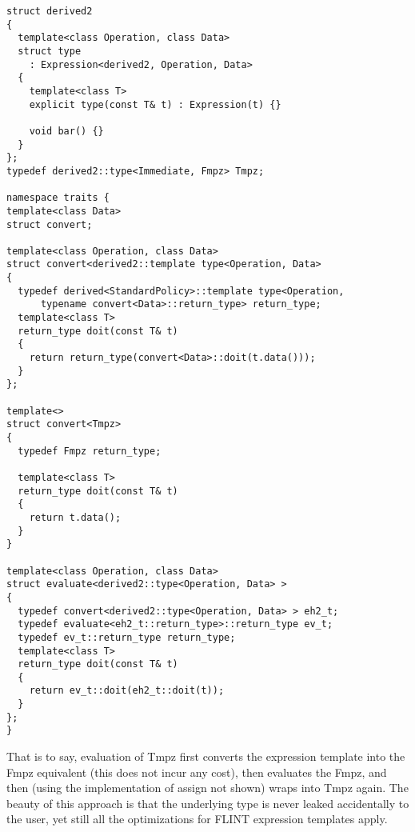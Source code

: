 \documentclass{scrartcl}
\begin{document}
\begin{verbatim}
struct derived2
{
  template<class Operation, class Data>
  struct type
    : Expression<derived2, Operation, Data>
  {
    template<class T>
    explicit type(const T& t) : Expression(t) {}

    void bar() {}
  }
};
typedef derived2::type<Immediate, Fmpz> Tmpz;

namespace traits {
template<class Data>
struct convert;

template<class Operation, class Data>
struct convert<derived2::template type<Operation, Data>
{
  typedef derived<StandardPolicy>::template type<Operation,
      typename convert<Data>::return_type> return_type;
  template<class T>
  return_type doit(const T& t)
  {
    return return_type(convert<Data>::doit(t.data()));
  }
};

template<>
struct convert<Tmpz>
{
  typedef Fmpz return_type;

  template<class T>
  return_type doit(const T& t)
  {
    return t.data();
  }
}

template<class Operation, class Data>
struct evaluate<derived2::type<Operation, Data> >
{
  typedef convert<derived2::type<Operation, Data> > eh2_t;
  typedef evaluate<eh2_t::return_type>::return_type ev_t;
  typedef ev_t::return_type return_type;
  template<class T>
  return_type doit(const T& t)
  {
    return ev_t::doit(eh2_t::doit(t));
  }
};
}
\end{verbatim}

That is to say, evaluation of Tmpz first converts the expression template
into the Fmpz equivalent (this does not incur any cost), then evaluates the
Fmpz, and then (using the implementation of assign not shown) wraps into
Tmpz again. The beauty of this approach is that the underlying type is
never leaked accidentally to the user, yet still all the optimizations for
FLINT expression templates apply.
\end{document}
